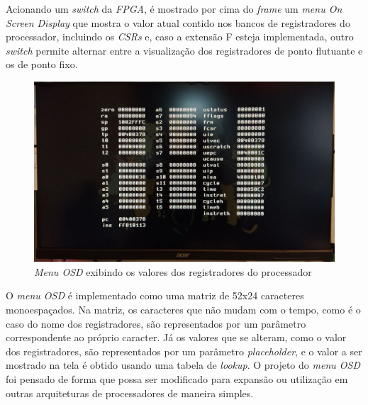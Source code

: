     { Acionando um \textit{switch} da \textit{FPGA}, é mostrado por cima do
        \textit{frame} um \textit{menu On Screen Display} que mostra o valor
        atual contido nos bancos de registradores do processador, incluindo os
        \textit{CSRs} e, caso a extensão F esteja implementada, outro
        \textit{switch} permite alternar entre a visualização dos registradores
        de ponto flutuante e os de ponto fixo.
    }
    \begin{figure}[H]
    \centering
        \includegraphics[width=.9\linewidth]{../images/osd/display_osd.jpg}
        \caption{\textit{Menu OSD} exibindo os valores dos registradores do processador}
        \label{fig:display_cats_osd}
    \end{figure}

    { O \textit{menu OSD} é implementado como uma matriz de 52x24 caracteres
        monoespaçados. Na matriz, os caracteres que não mudam com o tempo, como
        é o caso do nome dos registradores, são representados por um parâmetro
        correspondente ao próprio caracter. Já os valores que se alteram, como
        o valor dos registradores, são representados por um parâmetro
        \textit{placeholder}, e o valor a ser mostrado na tela é obtido usando
        uma tabela de \textit{lookup}. O projeto do \textit{menu OSD} foi pensado
        de forma que possa ser modificado para expansão ou utilização em outras
        arquiteturas de processadores de maneira simples.
    }

